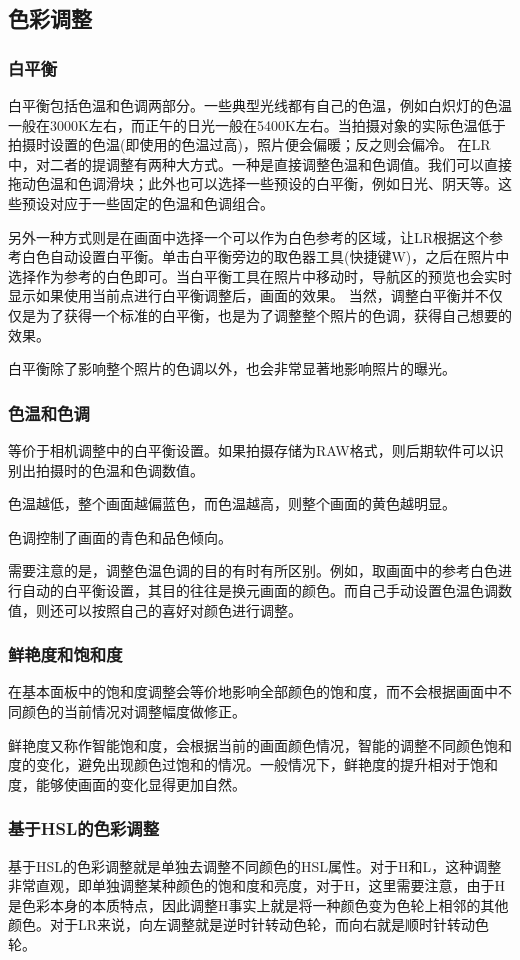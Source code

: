 \documentclass{ctexart}
\begin{document}
\subsection{色彩调整}
\subsubsection{白平衡}
白平衡包括色温和色调两部分。一些典型光线都有自己的色温，例如白炽灯的色温一般在3000K左右，而正午的日光一般在5400K左右。当拍摄对象的实际色温低于拍摄时设置的色温(即使用的色温过高)，照片便会偏暖；反之则会偏冷。
在LR中，对二者的提调整有两种大方式。一种是直接调整色温和色调值。我们可以直接拖动色温和色调滑块；此外也可以选择一些预设的白平衡，例如日光、阴天等。这些预设对应于一些固定的色温和色调组合。

另外一种方式则是在画面中选择一个可以作为白色参考的区域，让LR根据这个参考白色自动设置白平衡。单击白平衡旁边的取色器工具(快捷键W)，之后在照片中选择作为参考的白色即可。当白平衡工具在照片中移动时，导航区的预览也会实时显示如果使用当前点进行白平衡调整后，画面的效果。
当然，调整白平衡并不仅仅是为了获得一个标准的白平衡，也是为了调整整个照片的色调，获得自己想要的效果。

白平衡除了影响整个照片的色调以外，也会非常显著地影响照片的曝光。
\subsubsection{色温和色调}
等价于相机调整中的白平衡设置。如果拍摄存储为RAW格式，则后期软件可以识别出拍摄时的色温和色调数值。

色温越低，整个画面越偏蓝色，而色温越高，则整个画面的黄色越明显。

色调控制了画面的青色和品色倾向。

需要注意的是，调整色温色调的目的有时有所区别。例如，取画面中的参考白色进行自动的白平衡设置，其目的往往是换元画面的颜色。而自己手动设置色温色调数值，则还可以按照自己的喜好对颜色进行调整。
\subsubsection{鲜艳度和饱和度}
在基本面板中的饱和度调整会等价地影响全部颜色的饱和度，而不会根据画面中不同颜色的当前情况对调整幅度做修正。

鲜艳度又称作智能饱和度，会根据当前的画面颜色情况，智能的调整不同颜色饱和度的变化，避免出现颜色过饱和的情况。一般情况下，鲜艳度的提升相对于饱和度，能够使画面的变化显得更加自然。
\subsubsection{基于HSL的色彩调整}
基于HSL的色彩调整就是单独去调整不同颜色的HSL属性。对于H和L，这种调整非常直观，即单独调整某种颜色的饱和度和亮度，对于H，这里需要注意，由于H是色彩本身的本质特点，因此调整H事实上就是将一种颜色变为色轮上相邻的其他颜色。对于LR来说，向左调整就是逆时针转动色轮，而向右就是顺时针转动色轮。
\end{document}
